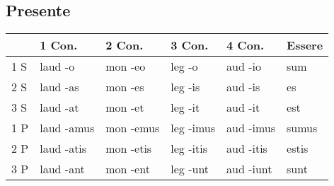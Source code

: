 \subsection{Presente}

\begin{table}[h!]
     \centering
     \begin{tabular}{|l|l|l|l|l|l|}
        \hline
        & \textbf{1 Con.} & \textbf{2 Con.} & \textbf{3 Con.} & \textbf{4 Con.} & \textbf{Essere}\\
        \hline
        1 S & laud -o    & mon -eo   & leg -o    & aud -io   & sum \\
        \hline
        2 S & laud -as   & mon -es   & leg -is   & aud -is   & es  \\
        \hline
        3 S & laud -at   & mon -et   & leg -it   & aud -it   & est \\
        \hline
        1 P & laud -amus & mon -emus & leg -imus & aud -imus & sumus\\
        \hline
        2 P & laud -atis & mon -etis & leg -itis & aud -itis & estis\\
        \hline
        3 P & laud -ant  & mon -ent  & leg -unt  & aud -iunt & sunt \\
        \hline
     \end{tabular}
\end{table}
